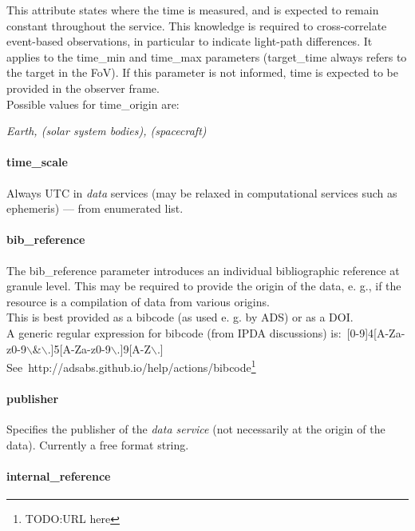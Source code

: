\documentclass[11pt,a4paper]{ivoa}
\begin{document}
This attribute states where the time is measured, and is expected to remain constant throughout the service. This knowledge is required to cross-correlate event-based observations, in particular to indicate light-path differences. It applies to the time\_min and time\_max parameters (target\_time always refers to the target in the FoV). If this parameter is not informed, time is expected to be provided in the observer frame.\\ Possible values for time\_origin are:

\emph{Earth, (solar system bodies), (spacecraft)}

\paragraph{time\_scale}

Always UTC in \emph{data} services (may be relaxed in computational services such as ephemeris) — from enumerated list.

\paragraph{bib\_reference}

The bib\_reference parameter introduces an individual bibliographic reference at granule level. This may be required to provide the origin of the data, e. g., if the resource is a compilation of data from various origins.\\ This is best provided as a bibcode (as used e. g. by ADS) or as a DOI. \\A generic regular expression for bibcode (from IPDA discussions) is: [0-9]{4}[A-Za-z0-9$\backslash$\&$\backslash$.]{5}[A-Za-z0-9$\backslash$.]{9}[A-Z$\backslash$.]\\See http://adsabs.github.io/help/actions/bibcode\footnote{TODO:URL here}

\paragraph{publisher}

Specifies the publisher of the \emph{data service} (not necessarily at the origin of the data). Currently a free format string.\\

\paragraph{internal\_reference}
\end{document}

